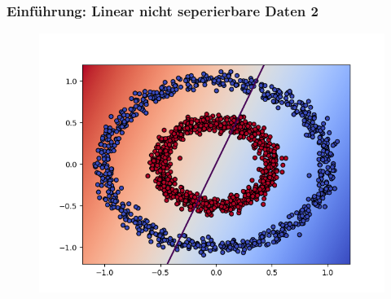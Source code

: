 	\begin{frame}
		\frametitle{Einführung: Linear nicht seperierbare Daten 2}
			\begin{figure}
					\includegraphics[width=\textwidth]{img/nonlinearsvmwbl.png}
			\end{figure}
	\end{frame}
	
